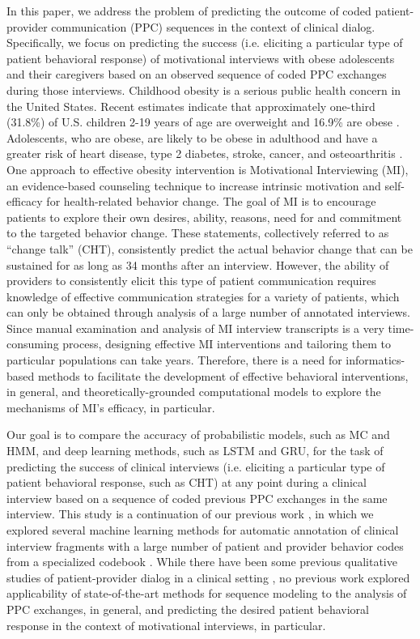 \documentclass{amia_summit_2018}
\begin{document}
In this paper, we address the problem of predicting the outcome of coded patient-provider communication (PPC) sequences in the context of clinical dialog. Specifically, we focus on predicting the success (i.e. eliciting a particular type of patient behavioral response) of motivational interviews with obese adolescents and their caregivers based on an observed sequence of coded PPC exchanges during those interviews. Childhood obesity is a serious public health concern in the United States. Recent estimates indicate that approximately one-third (31.8\%) of U.S. children 2-19 years of age are overweight and 16.9\% are obese \cite{ogden2012prevalence}. Adolescents, who are obese, are likely to be obese in adulthood and have a greater risk of heart disease, type 2 diabetes, stroke, cancer, and osteoarthritis \cite{general2010surgeon}. One approach to effective obesity intervention is Motivational Interviewing (MI), an evidence-based counseling technique to increase intrinsic motivation and self-efficacy for health-related behavior change. The goal of MI is to encourage patients to explore their own desires, ability, reasons, need for and commitment to the targeted behavior change. These statements, collectively referred to as ``change talk'' (CHT), consistently predict the actual behavior change\cite{apodaca2009mechanisms} that can be sustained for as long as 34 months\cite{walker2011influence} after an interview. However, the ability of providers to consistently elicit this type of patient communication requires knowledge of effective communication strategies for a variety of patients, which can only be obtained through analysis of a large number of annotated interviews. Since manual examination and analysis of MI interview transcripts is a very time-consuming process, designing effective MI interventions and tailoring them to particular populations can take years. Therefore, there is a need for informatics-based methods to facilitate the development of effective behavioral interventions, in general, and theoretically-grounded computational models to explore the mechanisms of MI's efficacy, in particular.

Our goal is to compare the accuracy of probabilistic models, such as MC and HMM, and deep learning methods, such as LSTM and GRU, for the task of predicting the success of clinical interviews (i.e. eliciting a particular type of patient behavioral response, such as CHT) at any point during a clinical interview based on a sequence of coded previous PPC exchanges in the same interview. This study is a continuation of our previous work \cite{kotov2015interpretable, hasan2016study}, in which we explored several machine learning methods for automatic annotation of clinical interview fragments with a large number of patient and provider behavior codes from a specialized codebook \cite{carcone2013provider}. While there have been some previous qualitative studies of patient-provider dialog in a clinical setting \cite{eide2004physician}, no previous work explored applicability of state-of-the-art methods for sequence modeling to the analysis of PPC exchanges, in general, and predicting the desired patient behavioral response in the context of motivational interviews, in particular.
\end{document}
